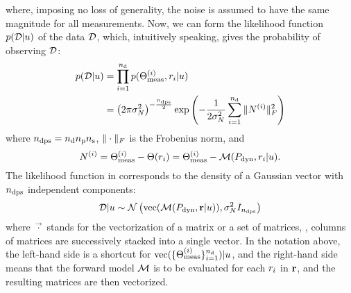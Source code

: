 where, imposing no loss of generality, the noise is assumed to have the same magnitude for all measurements. Now, we can form the likelihood function $\f{\data | \u}$ of the data $\mathcal{D}$, which, intuitively speaking, gives the probability of observing $\mathcal{D}$:
\begin{align}
  \f{\data | \u} & = \prod_{i = 1}^{\ndata} \f{\mT^{(i)}_\meas, \r_i | \u} \nonumber \\
  & = \left(2 \pi \sigma_\noise^2\right)^{-\frac{\ndcs}{2}} \exp\left( -\frac{1}{2 \sigma^2_\noise} \sum_{i = 1}^\ndata \fnorm{\mnoise^{(i)}}^2 \right) \elabel{likelihood}
\end{align}
where ${n_\text{dps}} = {n_\text{d}} {n_\text{p}} {n_\text{s}}$, $\| \cdot \|_F$ is the Frobenius norm, and
\[
  \mnoise^{(i)} = \mT^{(i)}_{\meas} - \mT(\r_i) = \mT^{(i)}_{\meas} - \model{\mP_\dyn, \r_i | \u}.
\]
The likelihood function in  corresponds to the density of a Gaussian vector with ${n_\text{dps}}$ independent components:
\[
  \data | \u \sim \gaussian{\vec{\model{\mP_\dyn, \vr | \u}}}{\sigma_\noise^2 \mI_\ndcs}
\]
where $\vec{\cdot}$ stands for the vectorization of a matrix or a set of matrices, \ie, columns of matrices are successively stacked into a single vector. In the notation above, the left-hand side is a shortcut for $\text{vec}(\{ \Theta_{\text{meas}}^{(i)} \}_{i = 1}^{n_\text{d}}) | u$, and the right-hand side means that the forward model $\model$ is to be evaluated for each $r_i$ in $\mathbf{r}$, and the resulting matrices are then vectorized.

